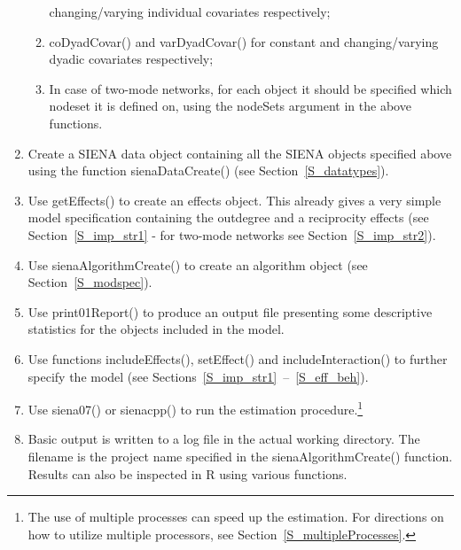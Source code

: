 \documentclass[a4paper,fleqn,11pt]{article}
\newcommand{\+}{\, + \,}
\newcommand{\sfn}[1]{\textsf{#1}}
\newcommand{\R}{{\sf R }}
\newcommand{\SI}{{\sf SIENA }}
\begin{document}
\begin{enumerate}
\begin{enumerate}
                changing/varying individual covariates respectively;
		\item	\sfn{coDyadCovar()} and \sfn{varDyadCovar()} for
                constant and changing/varying dyadic covariates respectively;
		\item	In case of two-mode networks, for each object it should
                be specified which nodeset it is defined on, using the
                \sfn{nodeSets} argument in the above functions.
	\end{enumerate}
	\item	Create a \SI data object containing all the \SI objects
            specified above using the function \sfn{sienaDataCreate()}
            (see Section~\ref{S_datatypes}).
	\item	Use \sfn{getEffects()} to create an effects object.
            This already gives a very simple model specification
            containing the outdegree and a reciprocity effects
            (see Section~\ref{S_imp_str1} - for two-mode networks see
            Section~\ref{S_imp_str2}).
	\item	Use \sfn{sienaAlgorithmCreate()} to create an algorithm object
                (see Section~\ref{S_modspec}).
	\item	Use \sfn{print01Report()} to produce an output file
                 presenting some descriptive statistics
                for the objects included in the model.
	\item	Use functions \sfn{includeEffects()}, \sfn{setEffect()} and
            \sfn{includeInteraction()} to further specify the model
            (see Sections~\ref{S_imp_str1}~--~\ref{S_eff_beh}).
	\item	Use \sfn{siena07()} or \sfn{sienacpp()}
            to run the estimation procedure.\footnote{The
            use of multiple processes can speed up the estimation.
            For directions on how to utilize multiple processors,
            see Section~\ref{S_multipleProcesses}.}
	\item	Basic output is written to a log file in the actual working directory.
             The filename is the project name specified in the
             \sfn{sienaAlgorithmCreate()} function. Results can also be
             inspected in \R using various functions.
\end{enumerate}
\end{document}
